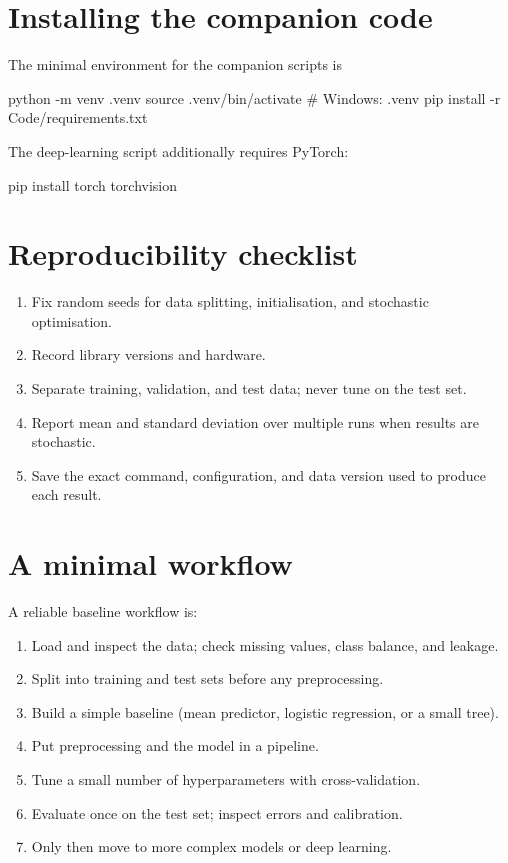 \documentclass[a4paper, 12pt]{book}
\begin{document}
\section{Installing the companion code}

The minimal environment for the companion scripts is
\begin{pycode}
python -m venv .venv
source .venv/bin/activate        # Windows: .venv\Scripts\activate
pip install -r Code/requirements.txt
\end{pycode}
The deep-learning script additionally requires PyTorch:
\begin{pycode}
pip install torch torchvision
\end{pycode}

\section{Reproducibility checklist}

\begin{enumerate}
    \item Fix random seeds for data splitting, initialisation, and stochastic
    optimisation.
    \item Record library versions and hardware.
    \item Separate training, validation, and test data; never tune on the test set.
    \item Report mean and standard deviation over multiple runs when results are
    stochastic.
    \item Save the exact command, configuration, and data version used to produce each
    result.
\end{enumerate}

\section{A minimal workflow}

A reliable baseline workflow is:
\begin{enumerate}
    \item Load and inspect the data; check missing values, class balance, and leakage.
    \item Split into training and test sets before any preprocessing.
    \item Build a simple baseline (mean predictor, logistic regression, or a small
    tree).
    \item Put preprocessing and the model in a pipeline.
    \item Tune a small number of hyperparameters with cross-validation.
    \item Evaluate once on the test set; inspect errors and calibration.
    \item Only then move to more complex models or deep learning.
\end{enumerate}

\backmatter
\printindex
\printbibliography
\end{document}
